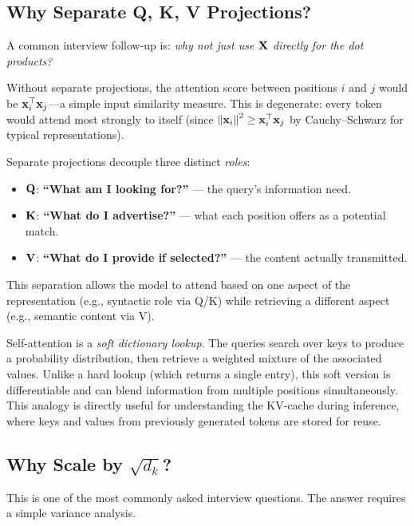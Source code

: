 \subsection{Why Separate Q, K, V Projections?}

A common interview follow-up is: \emph{why not just use $\mathbf{X}$ directly for the
dot products?}

Without separate projections, the attention score between positions $i$ and $j$
would be $\mathbf{x}_i^\top \mathbf{x}_j$---a simple input similarity measure.  This is
degenerate: every token would attend most strongly to itself (since
$\left\lVert\mathbf{x}_i\right\rVert^2 \geq \mathbf{x}_i^\top \mathbf{x}_j$ by Cauchy--Schwarz for typical
representations).

Separate projections decouple three distinct \emph{roles}:
\begin{itemize}
    \item $\mathbf{Q}$: \textbf{``What am I looking for?''} --- the query's
          information need.
    \item $\mathbf{K}$: \textbf{``What do I advertise?''} --- what each position
          offers as a potential match.
    \item $\mathbf{V}$: \textbf{``What do I provide if selected?''} --- the content
          actually transmitted.
\end{itemize}

This separation allows the model to attend based on one aspect of the
representation (e.g., syntactic role via Q/K) while retrieving a different
aspect (e.g., semantic content via V).

\begin{keyinsight}
Self-attention is a \emph{soft dictionary lookup}.  The queries search over
keys to produce a probability distribution, then retrieve a weighted mixture
of the associated values.  Unlike a hard lookup (which returns a single
entry), this soft version is differentiable and can blend information from
multiple positions simultaneously.  This analogy is directly useful for
understanding the KV-cache during inference, where keys and values from
previously generated tokens are stored for reuse.
\end{keyinsight}

\subsection{Why Scale by $\sqrt{d_k}$?}
\label{sec:sqrt-scaling}

This is one of the most commonly asked interview questions.  The answer
requires a simple variance analysis.

